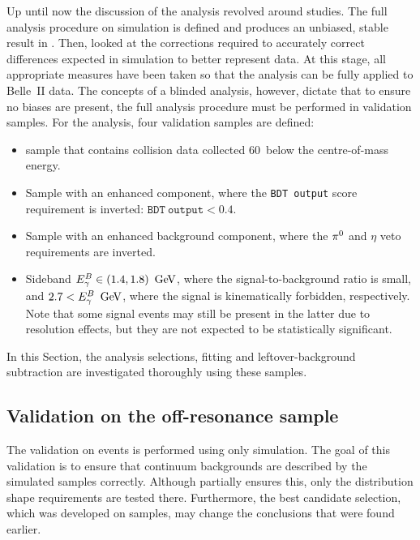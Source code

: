 Up until now the discussion of the analysis revolved around \MC studies.
The full analysis procedure on simulation is defined and produces an unbiased, stable result in .
Then,  looked at the corrections required to accurately correct differences expected in simulation to better represent data.
At this stage, all appropriate measures have been taken so that the analysis can be fully applied to Belle~II data.
The concepts of a blinded analysis, however, dictate that to ensure no biases are present, the full analysis procedure must be performed in validation samples.
For the \BtoXsgamma analysis, four validation samples are defined:
\begin{itemize}
    \item \epem\ra\qqbar sample that contains collision data collected 60~\mev below the \FourS centre-of-mass energy.
    \item Sample with an enhanced \epem\ra\qqbar component, where the \texttt{BDT~output} score requirement is inverted: $\mathtt{BDT~output}<0.4$.
    \item Sample with an enhanced \BB background component, where the $\pi^0$ and $\eta$ veto requirements are inverted.
    \item Sideband ${E^B_{\gamma}}\in(1.4,1.8)~\mathrm{\,Ge\kern -0.1em V}$, where the signal-to-background ratio is small, and \mbox{$2.7<{E^B_{\gamma}}~\mathrm{\,Ge\kern -0.1em V}$}, where the signal is kinematically forbidden, respectively.
    Note that some signal events may still be present in the latter due to resolution effects, but they are not expected to be statistically significant.
\end{itemize}
In this Section, the analysis selections, \Mbc fitting and leftover-\BB background subtraction are investigated thoroughly using these samples.

\subsection{Validation on the \texorpdfstring{\epem\ra\qqbar}{e+e- -> qqbar} off-resonance sample}\label{sec:continuum_spectrum_validation}

The validation on \epem\ra\qqbar events is performed using only \epem\ra\qqbar simulation.
The goal of this validation is to ensure that continuum backgrounds are described by the simulated samples correctly.
Although  partially ensures this, only the distribution shape requirements are tested there.
Furthermore, the best candidate selection, which was developed on \BB samples, may change the conclusions that were found earlier.

